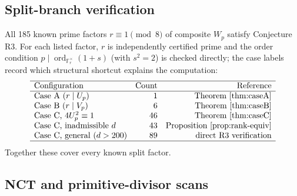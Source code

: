 \documentclass[11pt]{amsart}
\theoremstyle{plain}
\theoremstyle{definition}
\theoremstyle{remark}
\numberwithin{equation}{section}
\newcommand{\ord}{\operatorname{ord}}
\newcommand{\F}{\mathbb{F}}
\begin{document}
\subsection{Split-branch verification}\label{sec:R3-verify}

All 185 known prime factors $r\equiv1\pmod8$ of composite $W_p$ satisfy Conjecture R3. For each listed factor, $r$ is independently certified prime and the order condition $p\mid\ord_{\F_r^\times}(1+s)$ (with $s^2=2$) is checked directly; the case labels record which structural shortcut explains the computation:
\[
\begin{array}{lrr}
\hline
\text{Configuration} & \text{Count} & \text{Reference}\\
\hline
\text{Case A }(r\mid U_p) & 1 & \text{Theorem~\ref{thm:caseA}}\\
\text{Case B }(r\mid V_p) & 6 & \text{Theorem~\ref{thm:caseB}}\\
\text{Case C, }4U_p^2\equiv1 & 46 & \text{Theorem~\ref{thm:caseC}}\\
\text{Case C, inadmissible }d & 43 & \text{Proposition~\ref{prop:rank-equiv}}\\
\text{Case C, general }(d>200) & 89 & \text{direct R3 verification}\\
\hline
\end{array}
\]
Together these cover every known split factor.

\subsection{NCT and primitive-divisor scans}\label{sec:primdiv-survey}\label{sec:nct-verify}
\end{document}
